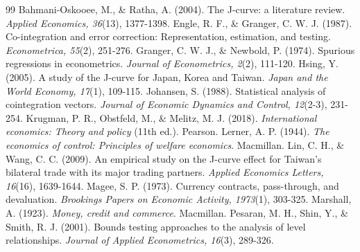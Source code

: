 \documentclass[a4paper,12pt]{article}
\begin{document}
\begin{thebibliography}{99}
Bahmani-Oskooee, M., \& Ratha, A. (2004). The J-curve: a literature review. \textit{Applied Economics, 36}(13), 1377-1398.
Engle, R. F., \& Granger, C. W. J. (1987). Co-integration and error correction: Representation, estimation, and testing. \textit{Econometrica, 55}(2), 251-276.
Granger, C. W. J., \& Newbold, P. (1974). Spurious regressions in econometrics. \textit{Journal of Econometrics, 2}(2), 111-120.
Hsing, Y. (2005). A study of the J-curve for Japan, Korea and Taiwan. \textit{Japan and the World Economy, 17}(1), 109-115.
Johansen, S. (1988). Statistical analysis of cointegration vectors. \textit{Journal of Economic Dynamics and Control, 12}(2-3), 231-254.
Krugman, P. R., Obstfeld, M., \& Melitz, M. J. (2018). \textit{International economics: Theory and policy} (11th ed.). Pearson.
Lerner, A. P. (1944). \textit{The economics of control: Principles of welfare economics}. Macmillan.
Lin, C. H., \& Wang, C. C. (2009). An empirical study on the J-curve effect for Taiwan’s bilateral trade with its major trading partners. \textit{Applied Economics Letters, 16}(16), 1639-1644.
Magee, S. P. (1973). Currency contracts, pass-through, and devaluation. \textit{Brookings Papers on Economic Activity, 1973}(1), 303-325.
Marshall, A. (1923). \textit{Money, credit and commerce}. Macmillan.
Pesaran, M. H., Shin, Y., \& Smith, R. J. (2001). Bounds testing approaches to the analysis of level relationships. \textit{Journal of Applied Econometrics, 16}(3), 289-326.
\end{thebibliography}
\end{document}
